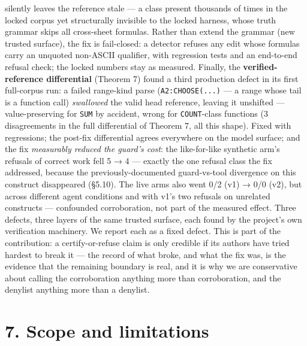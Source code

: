 \documentclass[
  11pt,
]{article}
\begin{document}
silently leaves the reference stale --- a class present thousands of
times in the locked corpus yet structurally invisible to the locked
harness, whose truth grammar skips all cross-sheet formulas. Rather than
extend the grammar (new trusted surface), the fix is fail-closed: a
detector refuses any edit whose formulas carry an unquoted non-ASCII
qualifier, with regression tests and an end-to-end refusal check; the
locked numbers stay as measured. Finally, the \textbf{verified-reference
differential} (Theorem 7) found a third production defect in its first
full-corpus run: a failed range-kind parse (\texttt{A2:CHOOSE(...)} ---
a range whose tail is a function call) \emph{swallowed} the valid head
reference, leaving it unshifted --- value-preserving for \texttt{SUM} by
accident, wrong for \texttt{COUNT}-class functions (3 disagreements in
the full differential of Theorem 7, all this shape). Fixed with
regressions; the post-fix differential agrees everywhere on the model
surface; and the fix \emph{measurably reduced the guard's cost}: the
like-for-like synthetic arm's refusals of correct work fell 5 → 4 ---
exactly the one refusal class the fix addressed, because the
previously-documented guard-vs-tool divergence on this construct
disappeared (§5.10). The live arms also went 0/2 (v1) → 0/0 (v2), but
across different agent conditions and with v1's two refusals on
unrelated constructs --- confounded corroboration, not part of the
measured effect. Three defects, three layers of the same trusted
surface, each found by the project's own verification machinery. We
report each as a fixed defect. This is part of the contribution: a
certify-or-refuse claim is only credible if its authors have tried
hardest to break it --- the record of what broke, and what the fix was,
is the evidence that the remaining boundary is real, and it is why we
are conservative about calling the corroboration anything more than
corroboration, and the denylist anything more than a denylist.

\section{7. Scope and limitations}\label{scope-and-limitations}
\end{document}
